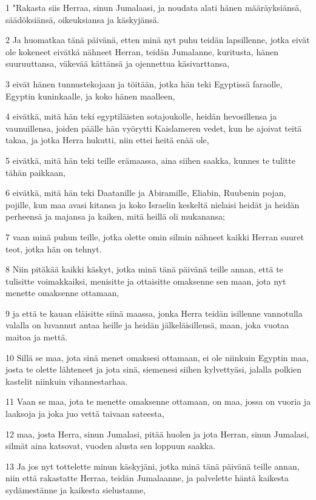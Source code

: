 \par 1 "Rakasta siis Herraa, sinun Jumalaasi, ja noudata alati hänen määräyksiänsä, säädöksiänsä, oikeuksiansa ja käskyjänsä.
\par 2 Ja huomatkaa tänä päivänä, etten minä nyt puhu teidän lapsillenne, jotka eivät ole kokeneet eivätkä nähneet Herran, teidän Jumalanne, kuritusta, hänen suuruuttansa, väkevää kättänsä ja ojennettua käsivarttansa,
\par 3 eivät hänen tunnustekojaan ja töitään, jotka hän teki Egyptissä faraolle, Egyptin kuninkaalle, ja koko hänen maalleen,
\par 4 eivätkä, mitä hän teki egyptiläisten sotajoukolle, heidän hevosillensa ja vaunuillensa, joiden päälle hän vyörytti Kaislameren vedet, kun he ajoivat teitä takaa, ja jotka Herra hukutti, niin ettei heitä enää ole,
\par 5 eivätkä, mitä hän teki teille erämaassa, aina siihen saakka, kunnes te tulitte tähän paikkaan,
\par 6 eivätkä, mitä hän teki Daatanille ja Abiramille, Eliabin, Ruubenin pojan, pojille, kun maa avasi kitansa ja koko Israelin keskeltä nielaisi heidät ja heidän perheensä ja majansa ja kaiken, mitä heillä oli mukanansa;
\par 7 vaan minä puhun teille, jotka olette omin silmin nähneet kaikki Herran suuret teot, jotka hän on tehnyt.
\par 8 Niin pitäkää kaikki käskyt, jotka minä tänä päivänä teille annan, että te tulisitte voimakkaiksi, menisitte ja ottaisitte omaksenne sen maan, jota nyt menette omaksenne ottamaan,
\par 9 ja että te kauan eläisitte siinä maassa, jonka Herra teidän isillenne vannotulla valalla on luvannut antaa heille ja heidän jälkeläisillensä, maan, joka vuotaa maitoa ja mettä.
\par 10 Sillä se maa, jota sinä menet omaksesi ottamaan, ei ole niinkuin Egyptin maa, josta te olette lähteneet ja jota sinä, siemenesi siihen kylvettyäsi, jalalla polkien kastelit niinkuin vihannestarhaa.
\par 11 Vaan se maa, jota te menette omaksenne ottamaan, on maa, jossa on vuoria ja laaksoja ja joka juo vettä taivaan sateesta,
\par 12 maa, josta Herra, sinun Jumalasi, pitää huolen ja jota Herran, sinun Jumalasi, silmät aina katsovat, vuoden alusta sen loppuun saakka.
\par 13 Ja jos nyt tottelette minun käskyjäni, jotka minä tänä päivänä teille annan, niin että rakastatte Herraa, teidän Jumalaanne, ja palvelette häntä kaikesta sydämestänne ja kaikesta sielustanne,
